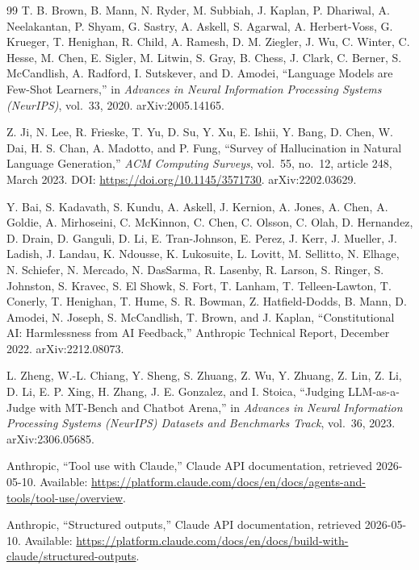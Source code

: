 \begin{thebibliography}{99}
T. B. Brown, B. Mann, N. Ryder, M. Subbiah, J. Kaplan, P. Dhariwal,
A. Neelakantan, P. Shyam, G. Sastry, A. Askell, S. Agarwal, A. Herbert-Voss,
G. Krueger, T. Henighan, R. Child, A. Ramesh, D. M. Ziegler, J. Wu, C. Winter,
C. Hesse, M. Chen, E. Sigler, M. Litwin, S. Gray, B. Chess, J. Clark, C. Berner,
S. McCandlish, A. Radford, I. Sutskever, and D. Amodei,
``Language Models are Few-Shot Learners,''
in \emph{Advances in Neural Information Processing Systems (NeurIPS)}, vol.~33,
2020. arXiv:2005.14165.

Z. Ji, N. Lee, R. Frieske, T. Yu, D. Su, Y. Xu, E. Ishii, Y. Bang, D. Chen,
W. Dai, H. S. Chan, A. Madotto, and P. Fung,
``Survey of Hallucination in Natural Language Generation,''
\emph{ACM Computing Surveys}, vol.~55, no.~12, article 248, March 2023.
DOI: \url{https://doi.org/10.1145/3571730}. arXiv:2202.03629.

Y. Bai, S. Kadavath, S. Kundu, A. Askell, J. Kernion, A. Jones, A. Chen,
A. Goldie, A. Mirhoseini, C. McKinnon, C. Chen, C. Olsson, C. Olah,
D. Hernandez, D. Drain, D. Ganguli, D. Li, E. Tran-Johnson, E. Perez, J. Kerr,
J. Mueller, J. Ladish, J. Landau, K. Ndousse, K. Lukosuite, L. Lovitt,
M. Sellitto, N. Elhage, N. Schiefer, N. Mercado, N. DasSarma, R. Lasenby,
R. Larson, S. Ringer, S. Johnston, S. Kravec, S. El Showk, S. Fort, T. Lanham,
T. Telleen-Lawton, T. Conerly, T. Henighan, T. Hume, S. R. Bowman,
Z. Hatfield-Dodds, B. Mann, D. Amodei, N. Joseph, S. McCandlish, T. Brown,
and J. Kaplan,
``Constitutional AI: Harmlessness from AI Feedback,''
Anthropic Technical Report, December 2022. arXiv:2212.08073.

L. Zheng, W.-L. Chiang, Y. Sheng, S. Zhuang, Z. Wu, Y. Zhuang, Z. Lin, Z. Li,
D. Li, E. P. Xing, H. Zhang, J. E. Gonzalez, and I. Stoica,
``Judging LLM-as-a-Judge with MT-Bench and Chatbot Arena,''
in \emph{Advances in Neural Information Processing Systems (NeurIPS)
Datasets and Benchmarks Track}, vol.~36, 2023. arXiv:2306.05685.


Anthropic, ``Tool use with Claude,'' Claude API documentation, retrieved
2026-05-10. Available:
\url{https://platform.claude.com/docs/en/docs/agents-and-tools/tool-use/overview}.

Anthropic, ``Structured outputs,'' Claude API documentation, retrieved
2026-05-10. Available:
\url{https://platform.claude.com/docs/en/docs/build-with-claude/structured-outputs}.


\end{thebibliography}
